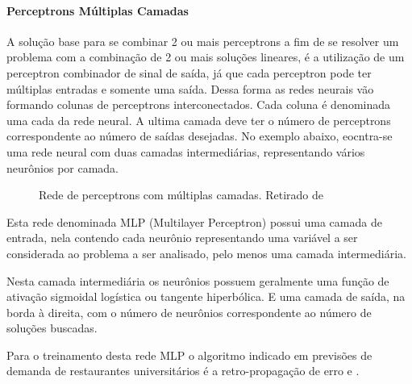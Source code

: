 \documentclass[	12pt, Times, openright, twoside, a4paper, english, brazil]{abntex2}
\begin{document}
  	       \paragraph*{Perceptrons Múltiplas Camadas}
  	       
  	       A solução base para se combinar 2 ou mais perceptrons a fim de se resolver um problema com a combinação de 2 ou mais soluções lineares, é a utilização de um perceptron combinador de sinal de saída, já que cada perceptron pode ter múltiplas entradas e somente uma saída. Dessa forma as redes neurais vão formando colunas de perceptrons interconectados.
  	       Cada coluna é denominada uma cada da rede neural. A ultima camada deve ter o número de perceptrons correspondente ao número de saídas desejadas.
  	       No exemplo abaixo, eocntra-se uma rede neural com duas camadas intermediárias, representando vários neurônios por camada.
  	       
  	       
  	       \begin{figure}[!ht]
  	       	\caption{Rede de perceptrons com múltiplas camadas. Retirado de \cite{Almeida2013}\label{fig:MLP}}
  	       \end{figure}
         
  	       Esta rede denominada MLP (Multilayer Perceptron) possui uma camada de entrada, nela contendo cada neurônio representando uma variável a ser considerada ao problema a ser analisado, pelo menos uma camada intermediária.
  	      
  	       Nesta camada intermediária os neurônios possuem geralmente uma função de ativação sigmoidal logística ou tangente hiperbólica.
  	       E uma camada de saída, na borda à direita, com o número de neurônios correspondente ao número de soluções buscadas. 
  	       
  	       Para o treinamento desta rede MLP o algoritmo indicado em previsões de demanda de restaurantes universitários é a retro-propagação de erro \cite{Lopes2008} e \cite{Rocha2011}.
  	       
\end{document}
